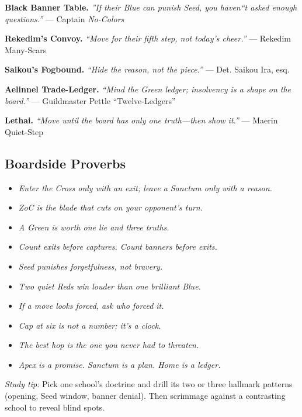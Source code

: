 \documentclass[11pt]{article}
\begin{document}
\noindent\textbf{Black Banner Table.} \textit{''If their Blue can punish Seed, you haven``t asked enough questions.''} --- Captain \emph{No-Colors}

\noindent\textbf{Rekedim's Convoy.} \textit{``Move for their fifth step, not today's cheer.''} --- Rekedim Many-Scars

\noindent\textbf{Saikou's Fogbound.} \textit{``Hide the reason, not the piece.''} --- Det. Saikou Ira, esq.

\noindent\textbf{Aelinnel Trade-Ledger.} \textit{``Mind the Green ledger; insolvency is a shape on the board.''} --- Guildmaster Pettle ``Twelve-Ledgers''

\noindent\textbf{Lethai.} \textit{``Move until the board has only one truth---then show it.''} --- Maerin Quiet-Step

\vspace{0.75em}

\subsection*{Boardside Proverbs}
\begin{itemize}\itemsep0.25em
  \item \textit{Enter the Cross only with an exit; leave a Sanctum only with a reason.}
  \item \textit{ZoC is the blade that cuts on your opponent's turn.}
  \item \textit{A Green is worth one lie and three truths.}
  \item \textit{Count exits before captures. Count banners before exits.}
  \item \textit{Seed punishes forgetfulness, not bravery.}
  \item \textit{Two quiet Reds win louder than one brilliant Blue.}
  \item \textit{If a move looks forced, ask who forced it.}
  \item \textit{Cap at six is not a number; it's a clock.}
  \item \textit{The best hop is the one you never had to threaten.}
  \item \textit{Apex is a promise. Sanctum is a plan. Home is a ledger.}
\end{itemize}

\bigskip

\noindent\emph{Study tip:} Pick one school's doctrine and drill its two or three hallmark patterns (opening, Seed window, banner denial). Then scrimmage against a contrasting school to reveal blind spots.
\end{document}
